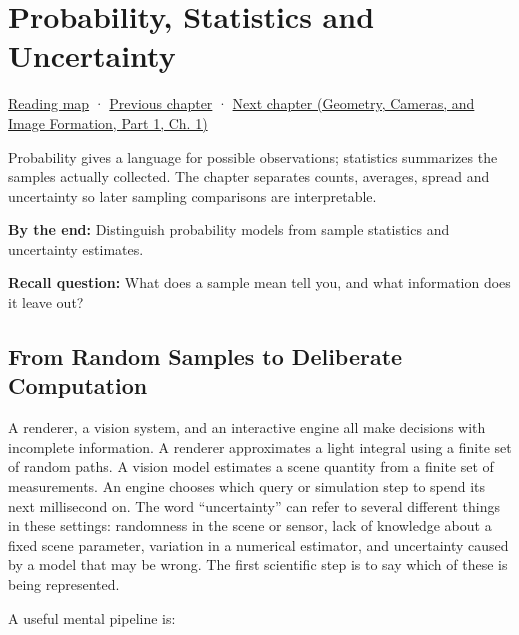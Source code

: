 \chapter{Probability, Statistics and Uncertainty}\label{03-visual-computing-i-ch012-probability-statistics-and-uncertainty}\hypertarget{03-visual-computing-i-ch012}{}\label{stagechapter:03-visual-computing-i-ch012}

\hypertarget{03-visual-computing-i-ch012-probability-statistics-and-uncertainty}{}

\hyperref[volume-reading-map]{Reading map} · \hyperref[02-foundations-ii-ch031]{Previous chapter} · \href{../03-Geometry-Cameras-and-Image-Formation-P01/main.pdf\#nameddest=02-foundations-ii-ch032}{Next chapter (Geometry, Cameras, and Image Formation, Part 1, Ch. 1)}

Probability gives a language for possible observations; statistics summarizes the samples actually collected. The chapter separates counts, averages, spread and uncertainty so later sampling comparisons are interpretable.

\textbf{By the end:} Distinguish probability models from sample statistics and uncertainty estimates.

\textbf{Recall question:} What does a sample mean tell you, and what information does it leave out?

\section{From Random Samples to Deliberate Computation}\label{03-visual-computing-i-ch012-from-random-samples-to-deliberate-computation}

\hypertarget{03-visual-computing-i-ch012-from-random-samples-to-deliberate-computation}{}

A renderer, a vision system, and an interactive engine all make decisions with incomplete information. A renderer approximates a light integral using a finite set of random paths. A vision model estimates a scene quantity from a finite set of measurements. An engine chooses which query or simulation step to spend its next millisecond on. The word ``uncertainty'' can refer to several different things in these settings: randomness in the scene or sensor, lack of knowledge about a fixed scene parameter, variation in a numerical estimator, and uncertainty caused by a model that may be wrong. The first scientific step is to say which of these is being represented.

A useful mental pipeline is:

